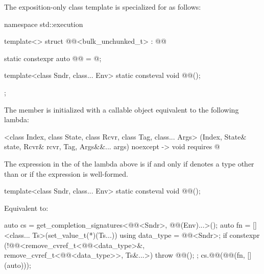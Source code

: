 \pnum
The exposition-only class template 
is specialized for  as follows:
\begin{codeblock}
namespace std::execution {
  template<>
  struct @@<bulk_unchunked_t> : @@ {
    static constexpr auto @@ = @\seebelow@;

    template<class Sndr, class... Env>
      static consteval void @@();
  };
}
\end{codeblock}
The member 
is initialized with a callable object equivalent to the following lambda:
\begin{codeblock}
[]<class Index, class State, class Rcvr, class Tag, class... Args>
  (Index, State& state, Rcvr& rcvr, Tag, Args&&... args) noexcept
  -> void requires @
\end{codeblock}
The expression in the  of the lambda above
is  if and only
if  denotes a type other than  or
if the expression  is well-formed.

\begin{itemdecl}
template<class Sndr, class... Env>
  static consteval void @@();
\end{itemdecl}

\begin{itemdescr}
\pnum
\effects
Equivalent to:
\begin{codeblock}
auto cs = get_completion_signatures<@@<Sndr>, @@(Env)...>();
auto fn = []<class... Ts>(set_value_t(*)(Ts...)) {
  using data_type = @@<Sndr>;
  if constexpr (!@@<remove_cvref_t<@@<data_type>&,
                           remove_cvref_t<@@<data_type>>, Ts&...>)
    throw @@();
};
cs.@@(@@(fn, [](auto){}));
\end{codeblock}
\end{itemdescr}

